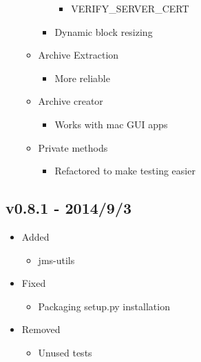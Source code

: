 \documentclass[letterpaper,10pt,english]{sphinxmanual}
\begin{document}
\begin{itemize}
\begin{itemize}
\begin{itemize}
\begin{itemize}
\item {} 
VERIFY\_SERVER\_CERT

\end{itemize}

\item {} 
Dynamic block resizing

\end{itemize}

\item {} 
Archive Extraction
\begin{itemize}
\item {} 
More reliable

\end{itemize}

\item {} 
Archive creator
\begin{itemize}
\item {} 
Works with mac GUI apps

\end{itemize}

\item {} 
Private methods
\begin{itemize}
\item {} 
Refactored to make testing easier

\end{itemize}

\end{itemize}

\end{itemize}


\subsection{v0.8.1 - 2014/9/3}
\label{release_history:v0-8-1-2014-9-3}\begin{itemize}
\item {} 
Added
\begin{itemize}
\item {} 
jms-utils

\end{itemize}

\item {} 
Fixed
\begin{itemize}
\item {} 
Packaging setup.py installation

\end{itemize}

\item {} 
Removed
\begin{itemize}
\item {} 
Unused tests

\end{itemize}

\end{itemize}
\end{document}
